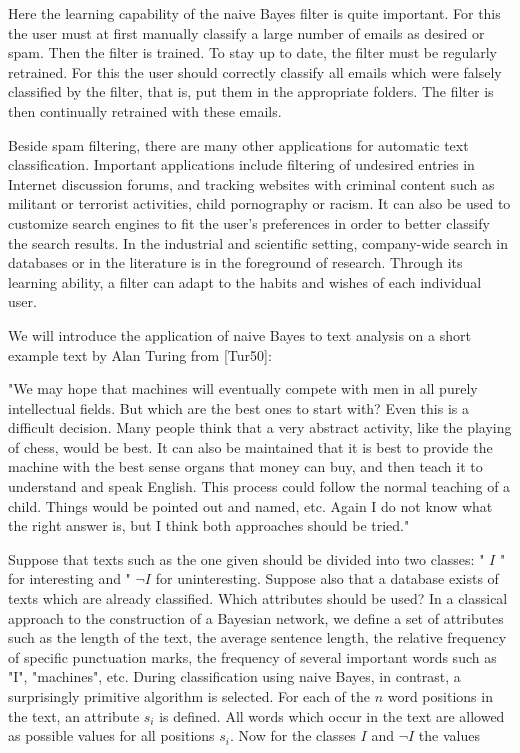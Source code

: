 \documentclass[10pt]{book}
\begin{document}
\begin{center}
\begin{enumerate}
\begin{center}
\begin{center}
\begin{center}
Here the learning capability of the naive Bayes filter is quite important. For this the user must at first manually classify a large number of emails as desired or spam. Then the filter is trained. To stay up to date, the filter must be regularly retrained. For this the user should correctly classify all emails which were falsely classified by the filter, that is, put them in the appropriate folders. The filter is then continually retrained with these emails.


Beside spam filtering, there are many other applications for automatic text classification. Important applications include filtering of undesired entries in Internet discussion forums, and tracking websites with criminal content such as militant or terrorist activities, child pornography or racism. It can also be used to customize search engines to fit the user's preferences in order to better classify the search results. In the industrial and scientific setting, company-wide search in databases or in the literature is in the foreground of research. Through its learning ability, a filter can adapt to the habits and wishes of each individual user.

We will introduce the application of naive Bayes to text analysis on a short example text by Alan Turing from [Tur50]:

\begin{displayquote}
"We may hope that machines will eventually compete with men in all purely intellectual fields. But which are the best ones to start with? Even this is a difficult decision. Many people think that a very abstract activity, like the playing of chess, would be best. It can also be maintained that it is best to provide the machine with the best sense organs that money can buy, and then teach it to understand and speak English. This process could follow the normal teaching of a child. Things would be pointed out and named, etc. Again I do not know what the right answer is, but I think both approaches should be tried."
\end{displayquote}

Suppose that texts such as the one given should be divided into two classes: " $I$ " for interesting and " $\neg I$ for uninteresting. Suppose also that a database exists of texts which are already classified. Which attributes should be used? In a classical approach to the construction of a Bayesian network, we define a set of attributes such as the length of the text, the average sentence length, the relative frequency of specific punctuation marks, the frequency of several important words such as "I", "machines", etc. During classification using naive Bayes, in contrast, a surprisingly primitive algorithm is selected. For each of the $n$ word positions in the text, an attribute $s_{i}$ is defined. All words which occur in the text are allowed as possible values for all positions $s_{i}$. Now for the classes $I$ and $\neg I$ the values



\end{center}
\end{center}
\end{center}
\end{enumerate}
\end{center}
\end{document}
